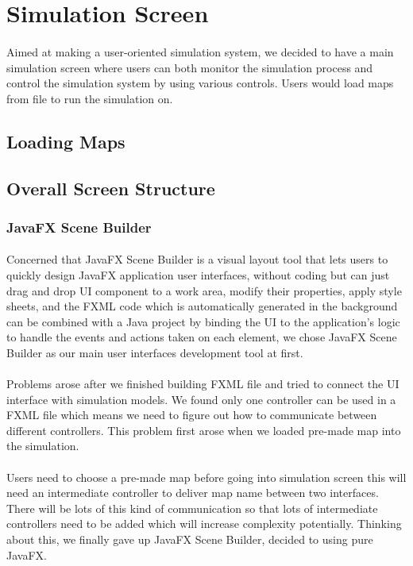 \documentclass[a4paper,11pt,titlepage]{article}
\begin{document}
\section{Simulation Screen}
\paragraph{}
Aimed at making a user-oriented simulation system, we decided to have a main simulation screen where users can both monitor the simulation process and control the simulation system by using various controls. Users would load maps from file to run the simulation on.
\subsection{Loading Maps}

\subsection{Overall Screen Structure}
\subsubsection{JavaFX Scene Builder}
\paragraph{}
Concerned that JavaFX Scene Builder is a visual layout tool that lets users to quickly design JavaFX application user interfaces, without coding but can just drag and drop UI component to a work area, modify their properties, apply style sheets, and the FXML code which is automatically generated in the background can be combined with a Java project by binding the UI to the application's logic to handle the events and actions taken on each element, we chose JavaFX Scene Builder as our main user interfaces development tool at first.
\paragraph{}
Problems arose after we finished building FXML file and  tried to connect the UI interface with simulation models. We found only one controller can be used in a FXML file which means we need to figure out how to communicate between different controllers. This problem first arose when we loaded pre-made map into the simulation. 
\paragraph{}
Users need to choose a pre-made map before going into simulation screen this will need an intermediate controller to deliver map name between two interfaces. There will be lots of this kind of communication so that lots of intermediate controllers need to be added which will increase complexity potentially. Thinking about this, we finally gave up JavaFX Scene Builder, decided to using pure JavaFX.
\end{document}
